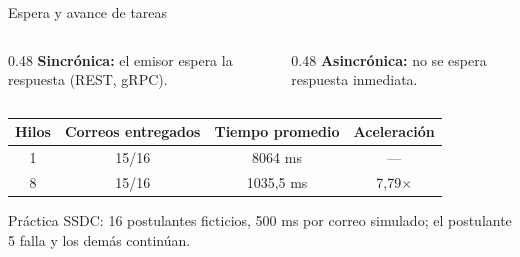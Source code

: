 \renewcommand{\fuentespie}{Fuentes: \cite{hbSimoes2026}}
\begin{frame}{Espera y avance de tareas}
  \begin{columns}[T,onlytextwidth]
    \begin{column}{0.48\textwidth}
      \small\textbf{Sincrónica:} el emisor espera la respuesta (REST, gRPC).~\cite{hbSimoes2026}
    \end{column}
    \begin{column}{0.48\textwidth}
      \small\textbf{Asincrónica:} no se espera respuesta inmediata.~\cite{hbSimoes2026}
    \end{column}
  \end{columns}

  \medskip
  \centering
  

  \medskip
  {\small
  \begin{tabular}{@{}cccc@{}}
    \toprule
    Hilos & Correos entregados & Tiempo promedio & Aceleración\\
    \midrule
    1 & 15/16 & 8064 ms & ---\\
    8 & 15/16 & 1035,5 ms & 7,79$\times$\\
    \bottomrule
  \end{tabular}\par}

  \smallskip
  {\scriptsize Práctica SSDC: 16 postulantes ficticios, 500 ms por correo simulado; el postulante 5 falla y los demás continúan.}
\end{frame}
\renewcommand{\fuentespie}{Fuentes: [PENDIENTE]}